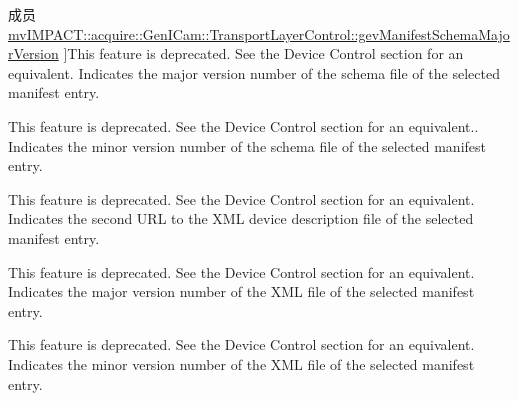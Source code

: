 \begin{DoxyRefList}
\hypertarget{deprecated__deprecated000090}{}%
成员 \hyperlink{classmv_i_m_p_a_c_t_1_1acquire_1_1_gen_i_cam_1_1_transport_layer_control_adb743bf3011dfaf67eee22d4cfdeab6c}{mv\+I\+M\+P\+A\+C\+T\+:\+:acquire\+:\+:Gen\+I\+Cam\+:\+:Transport\+Layer\+Control\+:\+:gev\+Manifest\+Schema\+Major\+Version} ]This feature is deprecated. See the Device Control section for an equivalent. Indicates the major version number of the schema file of the selected manifest entry.  
\item[\label{deprecated__deprecated000091}%
\hypertarget{deprecated__deprecated000091}{}%
成员 \hyperlink{classmv_i_m_p_a_c_t_1_1acquire_1_1_gen_i_cam_1_1_transport_layer_control_a526c7ffd26f143f3e12500591ce67e14}{mv\+I\+M\+P\+A\+C\+T\+:\+:acquire\+:\+:Gen\+I\+Cam\+:\+:Transport\+Layer\+Control\+:\+:gev\+Manifest\+Schema\+Minor\+Version} ]This feature is deprecated. See the Device Control section for an equivalent.. Indicates the minor version number of the schema file of the selected manifest entry.  
\item[\label{deprecated__deprecated000093}%
\hypertarget{deprecated__deprecated000093}{}%
成员 \hyperlink{classmv_i_m_p_a_c_t_1_1acquire_1_1_gen_i_cam_1_1_transport_layer_control_a45861368f934e515023577e0dfa49080}{mv\+I\+M\+P\+A\+C\+T\+:\+:acquire\+:\+:Gen\+I\+Cam\+:\+:Transport\+Layer\+Control\+:\+:gev\+Manifest\+Secondary\+U\+R\+L} ]This feature is deprecated. See the Device Control section for an equivalent. Indicates the second U\+R\+L to the X\+M\+L device description file of the selected manifest entry.  
\item[\label{deprecated__deprecated000087}%
\hypertarget{deprecated__deprecated000087}{}%
成员 \hyperlink{classmv_i_m_p_a_c_t_1_1acquire_1_1_gen_i_cam_1_1_transport_layer_control_aa076814262e6646b5a7178cd36454f50}{mv\+I\+M\+P\+A\+C\+T\+:\+:acquire\+:\+:Gen\+I\+Cam\+:\+:Transport\+Layer\+Control\+:\+:gev\+Manifest\+X\+M\+L\+Major\+Version} ]This feature is deprecated. See the Device Control section for an equivalent. Indicates the major version number of the X\+M\+L file of the selected manifest entry.  
\item[\label{deprecated__deprecated000088}%
\hypertarget{deprecated__deprecated000088}{}%
成员 \hyperlink{classmv_i_m_p_a_c_t_1_1acquire_1_1_gen_i_cam_1_1_transport_layer_control_a3b3747f9635ba2c4cbb432273209b092}{mv\+I\+M\+P\+A\+C\+T\+:\+:acquire\+:\+:Gen\+I\+Cam\+:\+:Transport\+Layer\+Control\+:\+:gev\+Manifest\+X\+M\+L\+Minor\+Version} ]This feature is deprecated. See the Device Control section for an equivalent. Indicates the minor version number of the X\+M\+L file of the selected manifest entry.  

\end{DoxyRefList}
